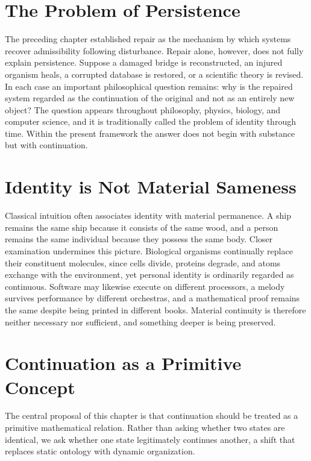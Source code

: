 \documentclass[11pt,oneside]{book}
\numberwithin{equation}{chapter}
\theoremstyle{definition}
\theoremstyle{plain}
\begin{document}
\section{The Problem of Persistence}

The preceding chapter established repair as the mechanism by which systems recover admissibility following disturbance. Repair alone, however, does not fully explain persistence. Suppose a damaged bridge is reconstructed, an injured organism heals, a corrupted database is restored, or a scientific theory is revised. In each case an important philosophical question remains: why is the repaired system regarded as the continuation of the original and not as an entirely new object? The question appears throughout philosophy, physics, biology, and computer science, and it is traditionally called the problem of identity through time. Within the present framework the answer does not begin with substance but with continuation.

\section{Identity is Not Material Sameness}

Classical intuition often associates identity with material permanence. A ship remains the same ship because it consists of the same wood, and a person remains the same individual because they possess the same body. Closer examination undermines this picture. Biological organisms continually replace their constituent molecules, since cells divide, proteins degrade, and atoms exchange with the environment, yet personal identity is ordinarily regarded as continuous. Software may likewise execute on different processors, a melody survives performance by different orchestras, and a mathematical proof remains the same despite being printed in different books. Material continuity is therefore neither necessary nor sufficient, and something deeper is being preserved.

\section{Continuation as a Primitive Concept}

The central proposal of this chapter is that continuation should be treated as a primitive mathematical relation. Rather than asking whether two states are identical, we ask whether one state legitimately continues another, a shift that replaces static ontology with dynamic organization.
\end{document}
